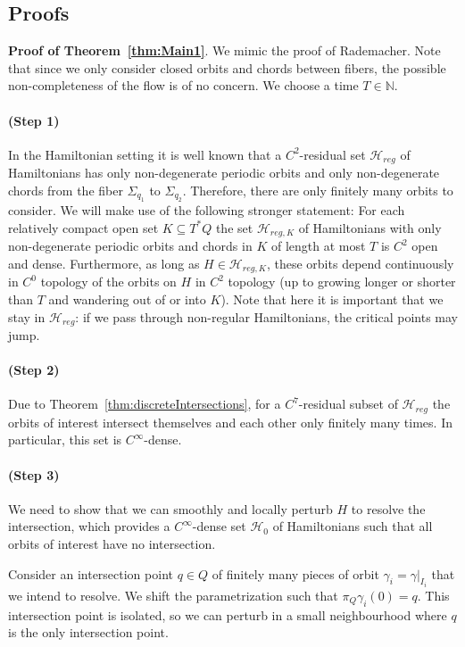 \documentclass{amsart}
\newcommand{\Hcal}{{\mathcal{H}}}
\newcommand{\NN}{\mathbb{N}}
\theoremstyle{definition}
\theoremstyle{remark}
\numberwithin{equation}{section}
\newcommand{\bparagraph}[1]{\vspace{1em}\noindent\textbf{#1}.\hspace{0.2cm}}
\begin{document}
\subsection{Proofs}

\bparagraph{Proof of Theorem~\ref{thm:Main1}} We mimic the proof of Rademacher. Note that since we only consider closed orbits and chords between fibers, the possible non-completeness of the flow is of no concern. We choose a time $T\in\NN$. 

\paragraph{(Step 1)} In the Hamiltonian setting it is well known that a $C^2$-residual set $\Hcal_{reg}$ of Hamiltonians has only non-degenerate periodic orbits and only non-degenerate chords from the fiber $\Sigma_{q_1}$ to $\Sigma_{q_2}$. Therefore, there are only finitely many orbits to consider. We will make use of the following stronger statement: For each relatively compact open set $K\subseteq T^*Q$ the set $\Hcal_{reg,K}$ of Hamiltonians with only non-degenerate periodic orbits and chords in $K$ of length at most $T$ is $C^2$ open and dense. Furthermore, as long as $H\in\Hcal_{reg,K}$, these orbits depend continuously in $C^0$ topology of the orbits on $H$ in $C^2$ topology (up to growing longer or shorter than $T$ and wandering out of or into $K$). Note that here it is important that we stay in $\Hcal_{reg}$: if we pass through non-regular Hamiltonians, the critical points may jump.

\paragraph{(Step 2)} Due to Theorem~\ref{thm:discreteIntersections}, for a $C^7$-residual subset of $\Hcal_{reg}$ the orbits of interest intersect themselves and each other only finitely many times. In particular, this set is $C^\infty$-dense.
\paragraph{(Step 3)} We need to show that we can smoothly and locally perturb $H$ to resolve the intersection, which provides a $C^\infty$-dense set $\Hcal_0$ of Hamiltonians such that all orbits of interest have no intersection. 

Consider an intersection point $q\in Q$ of finitely many pieces of orbit $\gamma_i=\gamma|_{I_i}$ that we intend to resolve. We shift the parametrization such that $\pi_Q\gamma_i(0)=q$. This intersection point is isolated, so we can perturb in a small neighbourhood where $q$ is the only intersection point.
\end{document}
